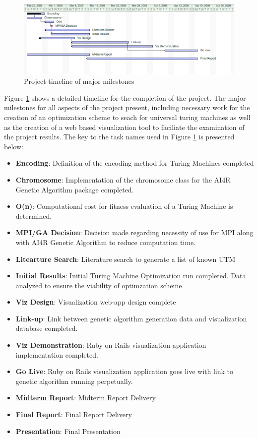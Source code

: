 \begin{figure}[htp]
\centering
\includegraphics[width=1\textwidth]{images/gantt.png}
\caption{Project timeline of major milestones}\label{fig:gantt}
\end{figure}
Figure \ref{fig:gantt} shows a detailed timeline for the completion of the project. The major milestones for all aspects of the project present, including necessary work for the creation of an optimization scheme to seach for universal turing machines as well as the creation of a web based visualization tool to faciliate the examination of the project results. The key to the task names used in Figure \ref{fig:gantt} is presented below: 
\begin{itemize}
	\item {\bf Encoding}:	Definition of the encoding method for Turing Machines completed
	\item {\bf Chromosome}: Implementation of the chromosome class for the AI4R Genetic Algorithm package completed.
	\item {\bf O(n)}:	Computational cost for fitness evaluation of a Turing Machine is determined.
	\item {\bf MPI/GA Decision}:	Decision made regarding necessity of use for MPI along with AI4R\nocite{AI4Rmanual} Genetic Algorithm to reduce computation time.
	\item {\bf Litearture Search}: Literature search to generate a list of known UTM  
	\item {\bf Initial Results}: Initial Turing Machine Optimization run completed. Data analyzed to ensure the viability of optimzation scheme
	\item {\bf Viz Design}: Visualization web-app design complete
	\item {\bf Link-up}: Link between genetic algorithm generation data and visualization database completed.
	\item {\bf Viz Demonstration}: Ruby on Rails visualization application implementation completed.
	\item {\bf Go Live}: Ruby on Rails visualization application goes live with link to genetic algorithm running perpetually.
	\item {\bf Midterm Report}: Midterm Report Delivery
	\item {\bf Final Report}: Final Report Delivery
	\item {\bf Presentation}:	Final Presentation
\end{itemize}
